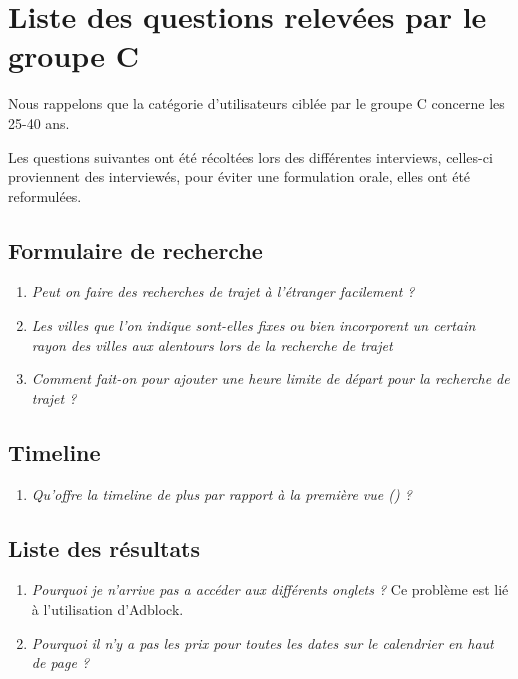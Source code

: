 \section{Liste des questions relev\'{e}es par le groupe C}

Nous rappelons que la cat\'{e}gorie d'utilisateurs cibl\'{e}e par le groupe C
concerne les 25-40 ans.


Les questions suivantes ont \'{e}t\'{e} r\'{e}colt\'{e}es lors des diff\'{e}rentes interviews, celles-ci proviennent des interview\'{e}s, pour \'{e}viter une formulation orale, elles ont \'{e}t\'{e} reformul\'{e}es.

\subsection{Formulaire de recherche}

\begin{enumerate}
\item {\em Peut on faire des recherches de trajet \`{a} l'\'{e}tranger facilement ?}
\item {\em Les villes que l'on indique sont-elles fixes ou bien incorporent un certain rayon des villes aux alentours lors de la recherche de trajet}
\item {\em Comment fait-on pour ajouter une heure limite de d\'{e}part pour la recherche de trajet ?}
\end{enumerate}

\subsection{Timeline}
\begin{enumerate}
\item {\em Qu'offre la timeline de plus par rapport \`{a} la premi\`{e}re vue () ?}
\end{enumerate}


\subsection{Liste des r\'{e}sultats}
\begin{enumerate}
\item {\em Pourquoi je n'arrive pas a acc\'{e}der aux diff\'{e}rents onglets ?} Ce probl\`{e}me est li\'{e} \`{a} l'utilisation d'Adblock.
\item {\em Pourquoi il n'y a pas les prix pour toutes les dates sur le calendrier en haut de page ?}


\end{enumerate}
